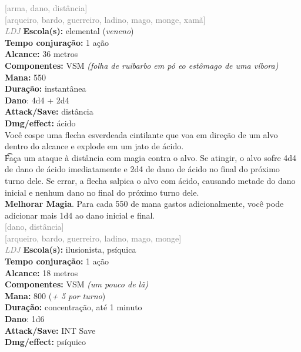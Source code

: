 \documentclass{RPG_Adventure}[2021/10/20]
\begin{document}
{\scriptsize \textcolor{gray}{[arma, dano, distância]\\}}
{\scriptsize \textcolor{gray}{[arqueiro, bardo, guerreiro, ladino, mago, monge, xamã]\\}}
{\tiny \textcolor{gray}{\textit{LDJ}}}\jump{}
{\small \t \textbf{Escola(s):} elemental (\textit{veneno})\\\t \textbf{Tempo conjuração:} 1 ação\\\t \textbf{Alcance:} 36 metros\\\t \textbf{Componentes:} VSM \textit{(folha de ruibarbo em pó eo estômago de uma víbora)}\\\t \textbf{Mana:} 550\\\t \textbf{Duração:} instantânea\\\t \textbf{Dano}: 4d4 + 2d4\\\t \textbf{Attack/Save:} distância\\\t \textbf{Dmg/effect:} ácido\\}
{\normalsize Você cospe uma flecha esverdeada cintilante que voa em direção de um alvo dentro do alcance e explode em um jato de ácido.\\\t Faça um ataque à distância com magia contra o alvo. Se atingir, o alvo sofre 4d4 de dano de ácido imediatamente e 2d4 de dano de ácido no final do próximo turno dele. Se errar, a flecha salpica o alvo com ácido, causando metade do dano inicial e nenhum dano no final do próximo turno dele.\\\t \textbf{Melhorar Magia}. Para cada 550 de mana gastos adicionalmente, você pode adicionar mais 1d4 ao dano inicial e final.\\}
{\scriptsize \textcolor{gray}{[dano, distância]\\}}
{\scriptsize \textcolor{gray}{[arqueiro, bardo, guerreiro, ladino, mago, monge]\\}}
{\tiny \textcolor{gray}{\textit{LDJ}}}\jump{}
{\small \t \textbf{Escola(s):} ilusionista, psíquica\\\t \textbf{Tempo conjuração:} 1 ação\\\t \textbf{Alcance:} 18 metros\\\t \textbf{Componentes:} VSM \textit{(um pouco de lã)}\\\t \textbf{Mana:} 800 (\textit{+ 5 por turno})\\\t \textbf{Duração:} concentração, até 1 minuto\\\t \textbf{Dano}: 1d6\\\t \textbf{Attack/Save:} INT Save\\\t \textbf{Dmg/effect:} psíquico\\}
\end{document}

